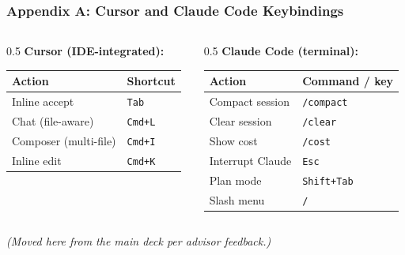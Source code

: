 \documentclass[10pt,english,aspectratio=169]{beamer}
\begin{document}
\begin{frame}
\frametitle{Appendix A: Cursor and Claude Code Keybindings}

\begin{columns}[T]
\begin{column}{0.5\textwidth}
\textbf{Cursor (IDE-integrated):}

\vspace{0.15cm}

\footnotesize
\begin{tabular}{|l|l|}
\hline
\textbf{Action} & \textbf{Shortcut} \\ \hline
Inline accept & \texttt{Tab} \\ \hline
Chat (file-aware) & \texttt{Cmd+L} \\ \hline
Composer (multi-file) & \texttt{Cmd+I} \\ \hline
Inline edit & \texttt{Cmd+K} \\ \hline
\end{tabular}
\end{column}
\begin{column}{0.5\textwidth}
\textbf{Claude Code (terminal):}

\vspace{0.15cm}

\footnotesize
\begin{tabular}{|l|l|}
\hline
\textbf{Action} & \textbf{Command / key} \\ \hline
Compact session & \texttt{/compact} \\ \hline
Clear session & \texttt{/clear} \\ \hline
Show cost & \texttt{/cost} \\ \hline
Interrupt Claude & \texttt{Esc} \\ \hline
Plan mode & \texttt{Shift+Tab} \\ \hline
Slash menu & \texttt{/} \\ \hline
\end{tabular}
\end{column}
\end{columns}

\vspace{0.4cm}

\normalsize
\textit{(Moved here from the main deck per advisor feedback.)}
\end{frame}
\end{document}
